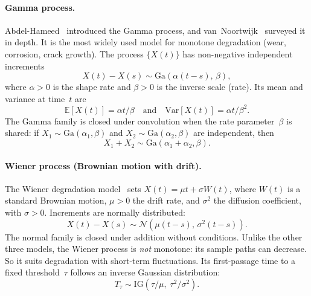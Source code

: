\documentclass[11pt,a4paper]{article}
\theoremstyle{plain}
\theoremstyle{definition}
\theoremstyle{remark}
\begin{document}
\paragraph{Gamma process.}
Abdel-Hameed~\cite{AbdelHameed1975} introduced the Gamma process, and van~Noortwijk~\cite{vanNoortwijk2009} surveyed it in depth.
It is the most widely used model for monotone degradation (wear, corrosion, crack growth).
The process $\{X(t)\}$ has non-negative independent increments
\begin{equation}
  X(t)-X(s) \sim \mathrm{Ga}(\alpha(t-s),\,\beta),
\end{equation}
where $\alpha>0$ is the shape rate and $\beta>0$ is the inverse scale (rate).
Its mean and variance at time~$t$ are
\begin{equation}
  \mathbb{E}[X(t)] = \alpha t/\beta
  \quad\text{and}\quad
  \mathrm{Var}[X(t)] = \alpha t/\beta^2.
\end{equation}
The Gamma family is closed under convolution when the rate parameter~$\beta$ is shared: if $X_1 \sim \mathrm{Ga}(\alpha_1,\beta)$ and $X_2 \sim \mathrm{Ga}(\alpha_2,\beta)$ are independent, then
\begin{equation}
  X_1+X_2 \sim \mathrm{Ga}(\alpha_1+\alpha_2,\beta).
\end{equation}

\paragraph{Wiener process (Brownian motion with drift).}
The Wiener degradation model~\cite{WhitmoreSchenkelberg1997} sets $X(t) = \mu t + \sigma W(t)$, where $W(t)$ is a standard Brownian motion, $\mu>0$ the drift rate, and $\sigma^2$ the diffusion coefficient, with $\sigma>0$.
Increments are normally distributed:
\begin{equation}
  X(t)-X(s) \sim \mathcal{N}(\mu(t-s),\,\sigma^2(t-s)).
\end{equation}
The normal family is closed under addition without conditions.
Unlike the other three models, the Wiener process is \emph{not} monotone: its sample paths can decrease.
So it suits degradation with short-term fluctuations.
Its first-passage time to a fixed threshold~$\tau$ follows an inverse Gaussian distribution:
\begin{equation}
  T_\tau \sim \mathrm{IG}(\tau/\mu,\;\tau^2/\sigma^2).
\end{equation}
\end{document}
